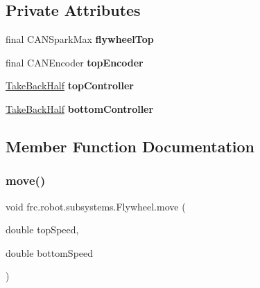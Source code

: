 \subsection*{Private Attributes}
\begin{DoxyCompactItemize}
\item 
\mbox{\label{classfrc_1_1robot_1_1subsystems_1_1_flywheel_abe224018ef775cb9076601c4dd553f09}} 
final C\+A\+N\+Spark\+Max {\bfseries flywheel\+Top}
\item 
\mbox{\label{classfrc_1_1robot_1_1subsystems_1_1_flywheel_a793d511ee618825bb473fc1331ec4c4d}} 
final C\+A\+N\+Encoder {\bfseries top\+Encoder}
\item 
\mbox{\label{classfrc_1_1robot_1_1subsystems_1_1_flywheel_a63ecc0efd717387a6e9f410b8e1b24d4}} 
\mbox{\hyperlink{classfrc_1_1robot_1_1controller_1_1_take_back_half}{Take\+Back\+Half}} {\bfseries top\+Controller}
\item 
\mbox{\label{classfrc_1_1robot_1_1subsystems_1_1_flywheel_aa8cf24272b0a57d4e721facbab85bdc6}} 
\mbox{\hyperlink{classfrc_1_1robot_1_1controller_1_1_take_back_half}{Take\+Back\+Half}} {\bfseries bottom\+Controller}
\end{DoxyCompactItemize}


\subsection{Member Function Documentation}
\mbox{\label{classfrc_1_1robot_1_1subsystems_1_1_flywheel_aa26e0c726e688afbbeee226084f447d8}} 
\subsubsection{\texorpdfstring{move()}{move()}}
{\footnotesize\ttfamily void frc.\+robot.\+subsystems.\+Flywheel.\+move (\begin{DoxyParamCaption}\item[{double}]{top\+Speed,  }\item[{double}]{bottom\+Speed }\end{DoxyParamCaption})\hspace{0.3cm}{\ttfamily [inline]}}



